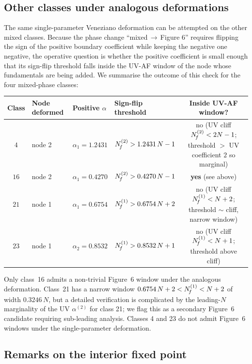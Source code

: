 \subsection{Other classes under analogous deformations}
\label{sec:phases-others}

The same single-parameter Veneziano deformation can be attempted on
the other mixed classes.  Because the phase change
``mixed\,$\to$\,Figure 6'' requires flipping the sign of the
positive boundary coefficient while keeping the negative one
negative, the operative question is whether the positive coefficient
is small enough that its sign-flip threshold falls inside the UV-AF
window of the node whose fundamentals are being added.  We summarise
the outcome of this check for the four mixed-phase classes:

\begin{center}
  \begin{tabular}{clllc}
    \toprule
    Class & Node deformed & Positive $\alpha$
          & Sign-flip threshold & Inside UV-AF window? \\
    \midrule
    $4$   & node 2 & $\alpha_{1}=1.2431$
          & $N_{\!f}^{(2)}>1.2431\,N-1$ & no (UV cliff $N_{\!f}^{(2)}<2N-1$;
          threshold $>$ UV coefficient $2$ so marginal) \\
    $16$  & node 2 & $\alpha_{1}=0.4270$
          & $N_{\!f}^{(2)}>0.4270\,N-1$ & \textbf{yes} (see above) \\
    $21$  & node 1 & $\alpha_{1}=0.6754$
          & $N_{\!f}^{(1)}>0.6754\,N+2$ & no (UV cliff $N_{\!f}^{(1)}<N+2$;
          threshold $\sim$ cliff, narrow window) \\
    $23$  & node 1 & $\alpha_{2}=0.8532$
          & $N_{\!f}^{(1)}>0.8532\,N+1$ & no (UV cliff $N_{\!f}^{(1)}<N+1$;
          threshold above cliff) \\
    \bottomrule
  \end{tabular}
\end{center}

Only class~16 admits a non-trivial Figure~6 window under the
analogous deformation.  Class~21 has a narrow window
$0.6754\,N+2<N_{\!f}^{(1)}<N+2$ of width $0.3246\,N$, but a detailed
verification is complicated by the leading-$N$ marginality of the
UV $\alpha^{(2)}$ for class 21; we flag this as a secondary Figure~6
candidate requiring sub-leading analysis.  Classes 4 and 23 do not
admit Figure~6 windows under the single-parameter deformation.

\subsection{Remarks on the interior fixed point}
\label{sec:phases-interior}

